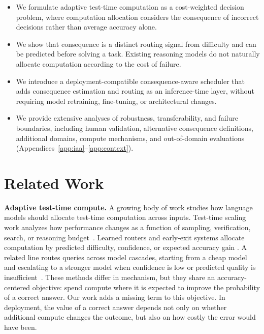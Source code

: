\documentclass{article}
\begin{document}
\begin{itemize}

\item We formulate adaptive test-time computation as a cost-weighted
decision problem, where computation allocation considers the consequence
of incorrect decisions rather than average accuracy alone.

\item We show that consequence is a distinct routing signal from
difficulty and can be predicted before solving a task. Existing
reasoning models do not naturally allocate computation according to the
cost of failure.

\item We introduce a deployment-compatible consequence-aware scheduler
that adds consequence estimation and routing as an inference-time layer,
without requiring model retraining, fine-tuning, or architectural
changes.

\item We provide extensive analyses of robustness, transferability, and
failure boundaries, including human validation, alternative consequence
definitions, additional domains, compute mechanisms, and out-of-domain
evaluations
(Appendices~\ref{app:iaa}--\ref{app:context}).

\end{itemize}

\section{Related Work}

\textbf{Adaptive test-time compute.}
A growing body of work studies how language models should allocate
test-time computation across inputs. Test-time scaling work analyzes
how performance changes as a function of sampling, verification,
search, or reasoning budget~\citep{snell2024scaling}. Learned
routers and early-exit systems allocate computation by predicted
difficulty, confidence, or expected accuracy gain
\citep{damani2024learning,manvi2024adaptive,qu2026adaptivetesttime}.
A related line routes queries across model cascades, starting from a
cheap model and escalating to a stronger model when confidence is low
or predicted quality is insufficient~\citep{chen2023frugalgpt,
aggarwal2024automix,ong2024routellm,ding2024hybrid}. These methods
differ in mechanism, but they share an accuracy-centered objective:
spend compute where it is expected to improve the probability of a
correct answer. Our work adds a missing term to this objective. In
deployment, the value of a correct answer depends not only on whether
additional compute changes the outcome, but also on how costly the
error would have been.
\end{document}
